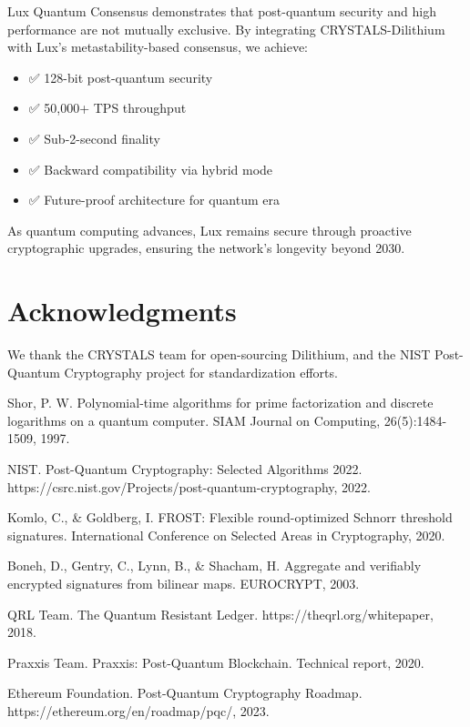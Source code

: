 \documentclass[11pt,letterpaper]{article}
\begin{document}
Lux Quantum Consensus demonstrates that post-quantum security and high performance are not mutually exclusive. By integrating CRYSTALS-Dilithium with Lux's metastability-based consensus, we achieve:

\begin{itemize}
    \item ✅ 128-bit post-quantum security
    \item ✅ 50,000+ TPS throughput
    \item ✅ Sub-2-second finality
    \item ✅ Backward compatibility via hybrid mode
    \item ✅ Future-proof architecture for quantum era
\end{itemize}

As quantum computing advances, Lux remains secure through proactive cryptographic upgrades, ensuring the network's longevity beyond 2030.

\section*{Acknowledgments}

We thank the CRYSTALS team for open-sourcing Dilithium, and the NIST Post-Quantum Cryptography project for standardization efforts.

\begin{thebibliography}{99}

Shor, P. W. Polynomial-time algorithms for prime factorization and discrete logarithms on a quantum computer. SIAM Journal on Computing, 26(5):1484-1509, 1997.

NIST. Post-Quantum Cryptography: Selected Algorithms 2022. https://csrc.nist.gov/Projects/post-quantum-cryptography, 2022.

Komlo, C., \& Goldberg, I. FROST: Flexible round-optimized Schnorr threshold signatures. International Conference on Selected Areas in Cryptography, 2020.

Boneh, D., Gentry, C., Lynn, B., \& Shacham, H. Aggregate and verifiably encrypted signatures from bilinear maps. EUROCRYPT, 2003.

QRL Team. The Quantum Resistant Ledger. https://theqrl.org/whitepaper, 2018.

Praxxis Team. Praxxis: Post-Quantum Blockchain. Technical report, 2020.

Ethereum Foundation. Post-Quantum Cryptography Roadmap. https://ethereum.org/en/roadmap/pqc/, 2023.

\end{thebibliography}
\end{document}
